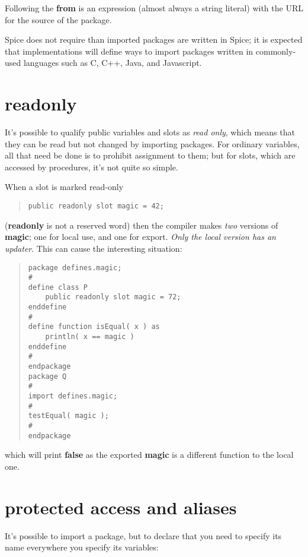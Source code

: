 \documentclass{report}
\begin{document}
Following the {\bf from} is an expression (almost always a string literal) with
the URL for the source of the package.

Spice does not require than imported packages are written in Spice; it is
expected that implementations will define ways to import packages written in
commonly-used languages such as C, C++, Java, and Javascript.

\section{readonly}


It's possible to qualify public variables and slots as {\em read only}, which
means that they can be read but not changed by importing packages. For ordinary
variables, all that need be done is to prohibit assignment to them; but
for slots, which are accessed by procedures, it's not quite so simple.

When a slot is marked read-only

\begin{quote}
\begin{verbatim}
public readonly slot magic = 42;
\end{verbatim}
\end{quote}


({\bf readonly} is not a reserved word) then the compiler makes {\em two} versions of
{\bf magic}; one for local use, and one for export. {\em Only the local version has an
updater}. This can cause the interesting situation:

\begin{quote}
\begin{verbatim}
package defines.magic;
#
define class P
    public readonly slot magic = 72;
enddefine
#
define function isEqual( x ) as
    println( x == magic )
enddefine
#
endpackage
package Q
#
import defines.magic;
#
testEqual( magic );
#
endpackage
\end{verbatim}
\end{quote}


which will print {\bf false} as the exported {\bf magic} is a different function to the
local one.

\section{protected access and aliases}


It's possible to import a package, but to declare that you need to specify its
name everywhere you specify its variables:
\end{document}
